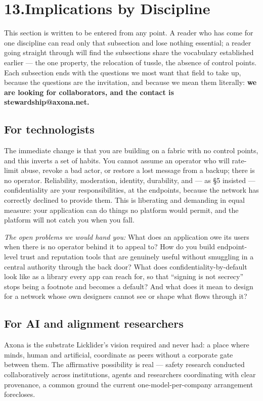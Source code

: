 \documentclass[nobib,justified]{tufte-handout}
\begin{document}
\section{13.\quad Implications by Discipline}

This section is written to be entered from any point. A reader who has come for
one discipline can read only that subsection and lose nothing essential; a reader
going straight through will find the subsections share the vocabulary established
earlier --- the one property, the relocation of tussle, the absence of control
points. Each subsection ends with the questions we most want that field to take
up, because the questions are the invitation, and because we mean them literally:
\textbf{we are looking for collaborators, and the contact is
stewardship@axona.net.}

\subsection{For technologists}

The immediate change is that you are building on a fabric with no control points,
and this inverts a set of habits. You cannot assume an operator who will
rate-limit abuse, revoke a bad actor, or restore a lost message from a backup;
there is no operator. Reliability, moderation, identity, durability, and --- as
\S5 insisted --- confidentiality are your responsibilities, at the
endpoints, because the network has correctly declined to provide them. This is
liberating and demanding in equal measure: your application can do things no
platform would permit, and the platform will not catch you when you fall.

\emph{The open problems we would hand you:} What does an application owe its users
when there is no operator behind it to appeal to? How do you build endpoint-level
trust and reputation tools that are genuinely useful without smuggling in a
central authority through the back door? What does confidentiality-by-default look
like as a library every app can reach for, so that ``signing is not secrecy''
stops being a footnote and becomes a default? And what does it mean to design for
a network whose own designers cannot see or shape what flows through it?

\subsection{For AI and alignment researchers}

Axona is the substrate Licklider's vision required and never had: a place where
minds, human and artificial, coordinate as peers without a corporate gate between
them. The affirmative possibility is real --- safety research conducted
collaboratively across institutions, agents and researchers coordinating with
clear provenance, a common ground the current one-model-per-company arrangement
forecloses.
\end{document}
